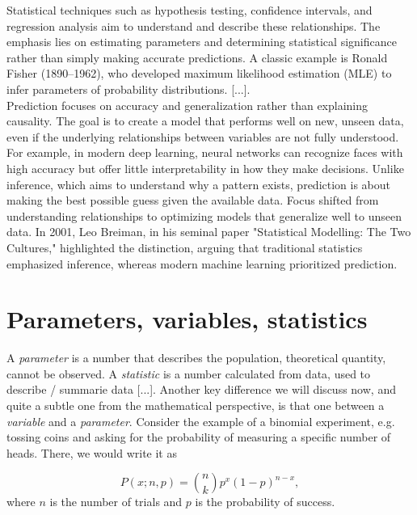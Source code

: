 \documentclass{book}
\begin{document}
Statistical techniques such as hypothesis testing, confidence intervals, and regression analysis aim to understand and describe these relationships. The emphasis lies on estimating parameters and determining statistical significance rather than simply making accurate predictions. A classic example is Ronald Fisher (1890–1962), who developed maximum likelihood estimation (MLE) to infer parameters of probability distributions. [...].\\

Prediction focuses on accuracy and generalization rather than explaining causality. The goal is to create a model that performs well on new, unseen data, even if the underlying relationships between variables are not fully understood. For example, in modern deep learning, neural networks can recognize faces with high accuracy but offer little interpretability in how they make decisions. Unlike inference, which aims to understand why a pattern exists, prediction is about making the best possible guess given the available data. Focus shifted from understanding relationships to optimizing models that generalize well to unseen data. In 2001, Leo Breiman, in his seminal paper "Statistical Modelling: The Two Cultures," highlighted the distinction, arguing that traditional statistics emphasized inference, whereas modern machine learning prioritized prediction.\\

\section{Parameters, variables, statistics}

A \textit{parameter} is a number that describes the population, theoretical quantity, cannot be observed. A \textit{statistic} is a number calculated from data, used to describe / summarie data [...]. Another key difference we will discuss now, and quite a subtle one from the mathematical perspective, is that one between a \textit{variable} and a \textit{parameter}. Consider the example of a binomial experiment, e.g. tossing coins and asking for the probability of measuring a specific number of heads. There, we would write it as 

\begin{equation}
    P(x; n, p) = \binom{n}{k} p^x (1-p)^{n-x},
\end{equation}
where $n$ is the number of trials and $p$ is the probability of success.\\
\end{document}

